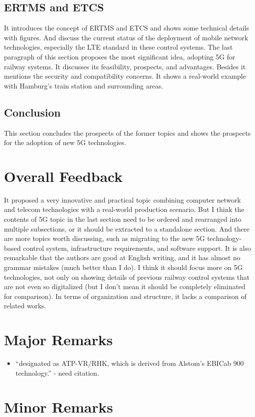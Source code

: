 \documentclass[a4paper,9pt]{scrartcl}
\begin{document}
\subsection{ERTMS and ETCS}
It introduces the concept of ERTMS and ETCS and shows some technical details with figures. And discuss the current status of the deployment of mobile network technologies, especially the LTE standard in these control systems.
The last paragraph of this section proposes the most significant idea, adopting 5G for railway systems. It discusses its feasibility, prospects, and advantages. Besides it mentions the security and compatibility concerns. It shows a real-world example with Hamburg's train station and surrounding areas.

\subsection{Conclusion}
This section concludes the prospects of the former topics and shows the prospects for the adoption of new 5G technologies.


\section{Overall Feedback}
It proposed a very innovative and practical topic combining computer network and telecom technologies with a real-world production scenario.
But I think the contents of 5G topic in the last section need to be ordered and rearranged into multiple subsections, or it should be extracted to a standalone section.
And there are more topics worth discussing, such as migrating to the new 5G technology-based control system, infrastructure requirements, and software support.
It is also remarkable that the authors are good at English writing, and it has almost no grammar mistakes (much better than I do).
I think it should focus more on 5G technologies, not only on showing details of previous railway control systems that are not even so digitalized (but I don't mean it should be completely eliminated for comparison).
In terms of organization and structure, it lacks a comparison of related works.

\section{Major Remarks}
\begin{itemize}
    \item \enquote{designated as ATP-VR/RHK, which is derived from Alstom’s
EBICab 900 technology.} - need citation.
\end{itemize}

\section{Minor Remarks}
\end{document}
